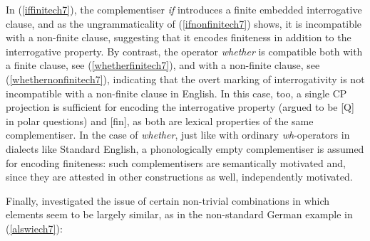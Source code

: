 \begin{sloppypar}
In (\ref{iffinitech7}), the complementiser \textit{if} introduces a finite embedded interrogative clause, and as the ungrammaticality of (\ref{ifnonfinitech7}) shows, it is incompatible with a non-finite clause, suggesting that it encodes finiteness in addition to the interrogative property. By contrast, the operator \textit{whether} is compatible both with a finite clause, see (\ref{whetherfinitech7}), and with a non-finite clause, see (\ref{whethernonfinitech7}), indicating that the overt marking of interrogativity is not incompatible with a non-finite clause in English. In this case, too, a single CP projection is sufficient for encoding the interrogative property (argued to be [Q] in polar questions) and [fin], as both are lexical properties of the same complementiser. In the case of \textit{whether}, just like with ordinary \textit{wh}-operators in dialects like Standard English, a phonologically empty complementiser is assumed for encoding finiteness: such complementisers are semantically motivated and, since they are attested in other constructions as well, independently motivated.
\end{sloppypar}

Finally,  investigated the issue of certain non-trivial combinations in which elements seem to be largely similar, as in the non-standard German example in (\ref{alswiech7}):

\ea 
{}
\z
\z

